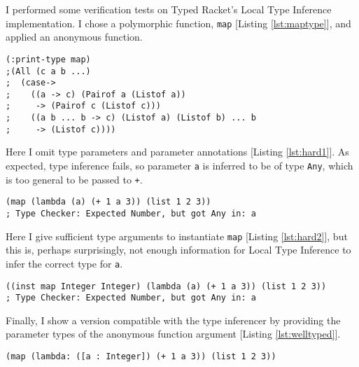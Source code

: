 \documentclass[12pt,a4paper]{article}
\begin{document}
I performed some verification tests on Typed Racket's Local Type Inference 
implementation. I chose a polymorphic function, \lstinline|map| [Listing \ref{lst:maptype}], and applied
an anonymous function.

\begin{lstlisting}[caption=Type of Typed Racket's map, label=lst:maptype]
(:print-type map)
;(All (c a b ...) 
;  (case-> 
;    ((a -> c) (Pairof a (Listof a)) 
;     -> (Pairof c (Listof c)))
;    ((a b ... b -> c) (Listof a) (Listof b) ... b 
;     -> (Listof c))))
\end{lstlisting}

Here I omit type parameters and parameter annotations [Listing \ref{lst:hard1}]. As expected,
type inference fails, so parameter \lstinline|a| is inferred to be
of type \lstinline|Any|, which is too general to be passed to
\lstinline|+|.

\begin{lstlisting}[caption=Hard to Synthesise Polymorphic Application without Type Arguments and Annotations - Typed Racket, label=lst:hard1]
(map (lambda (a) (+ 1 a 3)) (list 1 2 3))
; Type Checker: Expected Number, but got Any in: a
\end{lstlisting}

Here I give sufficient type arguments to instantiate \lstinline|map| [Listing \ref{lst:hard2}], but
this is, perhaps surprisingly, not enough information for Local Type Inference to
infer the correct type for \lstinline|a|.

\begin{lstlisting}[caption=Hard to Synthesise Polymorphic Application with Type Arguments without Annotations - Typed Racket, label=lst:hard2]
((inst map Integer Integer) (lambda (a) (+ 1 a 3)) (list 1 2 3))
; Type Checker: Expected Number, but got Any in: a
\end{lstlisting}

Finally, I show a version compatible with the type inferencer by
providing  the parameter types of the anonymous function argument [Listing \ref{lst:welltyped}].

\begin{lstlisting}[caption=Well Typed - Typed Racket, label=lst:welltyped]
(map (lambda: ([a : Integer]) (+ 1 a 3)) (list 1 2 3))
\end{lstlisting}
\end{document}
